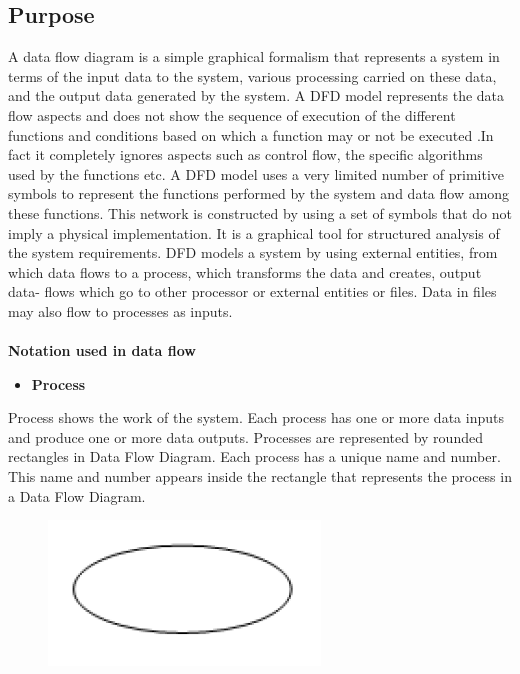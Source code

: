 \documentclass[12pt,a4paper,oneside]{report}
\begin{document}
\subsection{Purpose}
A data flow diagram is a simple graphical formalism that represents a system in terms
of the input data to the system, various processing carried on these data, and the output data
generated by the system. A DFD model represents the data flow aspects and does not show
the sequence of execution of the different functions and conditions based on which a function
may or not be executed .In fact it completely ignores aspects such as control flow, the specific
algorithms used by the functions etc.
A DFD model uses a very limited number of primitive symbols to represent the functions
performed by the system and data flow among these functions. This network is constructed
by using a set of symbols that do not imply a physical implementation. It is a graphical tool
for structured analysis of the system requirements. DFD models a system by using external
entities, from which data flows to a process, which transforms the data and creates, output data-
flows which go to other processor or external entities or files. Data in files may also flow
to processes as inputs.\\
\\
\textbf {Notation used in data flow}
\begin{itemize}
\item\textbf{Process}
\end{itemize}
\par Process shows the work of the system. Each process has one or more data inputs and produce one or more data outputs. Processes are represented by rounded rectangles in
Data Flow Diagram. Each process has a unique name and number. This name and
number appears inside the rectangle that represents the process in a Data Flow Diagram.\\
\begin{figure}[h]
  	\begin{center}
  	
  	
  		\includegraphics[width=3 in,height=1 in]{ellipse.png}
  			\end{center}
  \end{figure}
\end{document}
